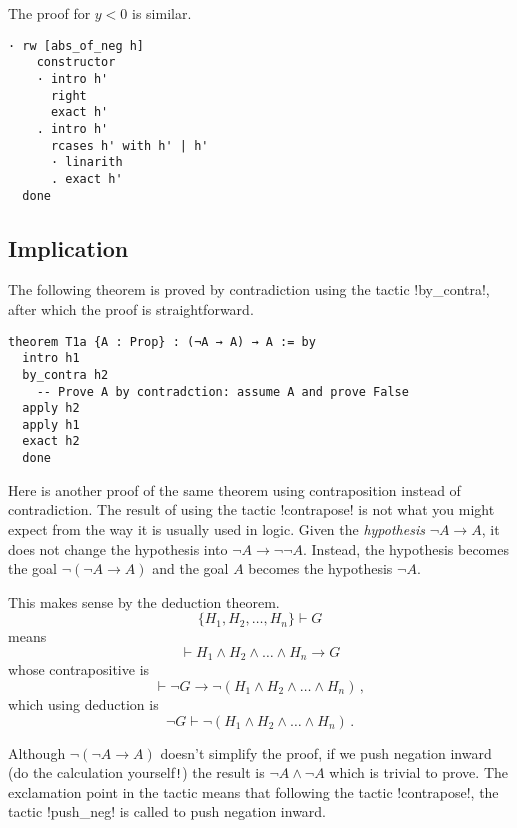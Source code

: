 

The proof for $y< 0$ is similar.
\begin{Verbatim}[firstnumber=last]
  · rw [abs_of_neg h]
    constructor
    · intro h'
      right
      exact h'
    . intro h'
      rcases h' with h' | h'
      · linarith
      . exact h'
  done
\end{Verbatim}

\subsection{Implication}

The following theorem is proved by contradiction using the tactic !by_contra!, after which the proof is straightforward.
\begin{Verbatim}
theorem T1a {A : Prop} : (¬A → A) → A := by
  intro h1
  by_contra h2
    -- Prove A by contradction: assume A and prove False
  apply h2
  apply h1
  exact h2
  done
\end{Verbatim}


Here is another proof of the same theorem using contraposition instead of contradiction. The result of using the tactic !contrapose! is not what you might expect from the way it is usually used in logic. Given the \emph{hypothesis} $\neg A \rightarrow A$, it does not change the hypothesis into $\neg A \rightarrow \neg\neg A$. Instead, the hypothesis becomes the goal $\neg(\neg A \rightarrow A)$ and the goal $A$ becomes the hypothesis $\neg A$.

This makes sense by the deduction theorem.
\[
\{H_1, H_2, \ldots, H_n\} \vdash G 
\]
means 
\[
\vdash H_1\wedge H_2 \wedge \ldots \wedge H_n \rightarrow G
\]
whose contrapositive is
\[
\vdash \neg G \rightarrow \neg (H_1\wedge H_2 \wedge \ldots \wedge H_n)\,,
\]
which using deduction is
\[
\neg G \vdash \neg (H_1\wedge H_2 \wedge \ldots \wedge H_n)\,.
\]

Although $\neg(\neg A \rightarrow A)$ doesn't simplify the proof, if we push negation inward (do the calculation yourself\verb+!+) the result is $\neg A \wedge \neg A$ which is trivial to prove. The exclamation point in the tactic means that following the tactic !contrapose!, the tactic !push_neg! is called to push negation inward.

